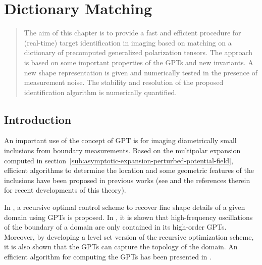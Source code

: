 \def\chapname{Dictionary Matching}
\chapter[\chapname]
{\chapname {}}

\label{chap:dico-matching}

\begin{abstract}
The aim of this chapter is to provide a fast and efficient procedure
for (real-time) target identification in imaging based on matching
on a dictionary of precomputed generalized polarization tensors.
The approach is based on some important properties of the
GPTs and new invariants. A new shape representation is given and
numerically tested in the presence of measurement noise. The
stability and resolution of the proposed identification algorithm
is numerically quantified.
\end{abstract}

\section{Introduction}

An important use of the concept of GPT is for imaging diametrically
small inclusions from boundary measurements. Based on the multipolar expansion
computed in section~\ref{sub:asymptotic-expansion-perturbed-potential-field},
efficient algorithms to
determine the location and some geometric features of the
inclusions have been proposed in previous works (see \cite{ammari2004reconstruction,
ammari2007polarization} and the references therein for recent
developments of this theory).

In \cite{ammari2010conductivity}, a recursive optimal control scheme to recover
fine shape details of a given domain using GPTs is proposed. In
\cite{AGKLY11}, it is shown that high-frequency oscillations of
the boundary of a domain are only contained in its high-order
GPTs. Moreover, by developing a level set version of the recursive
optimization scheme, it is also shown that the GPTs can capture
the topology of the domain. An efficient algorithm for computing
the GPTs has been presented in \cite{yves}.


